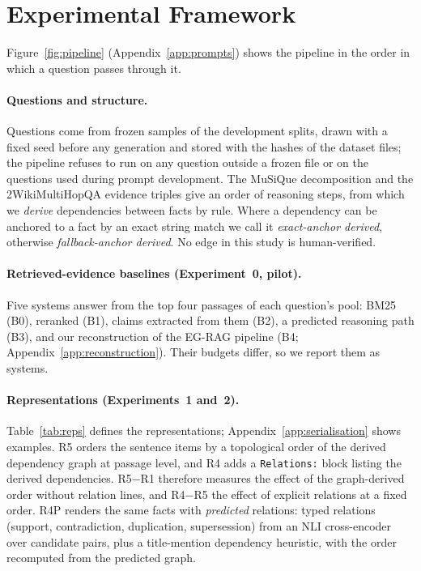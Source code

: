 \section{Experimental Framework}
\label{sec:framework}

Figure~\ref{fig:pipeline} (Appendix~\ref{app:prompts}) shows the pipeline in the order in which a question passes through it.


\paragraph{Questions and structure.}
Questions come from frozen samples of the development splits, drawn with a fixed seed before any generation and stored with the hashes of the dataset files; the pipeline refuses to run on any question outside a frozen file or on the questions used during prompt development. The MuSiQue decomposition and the 2WikiMultiHopQA evidence triples give an order of reasoning steps, from which we \emph{derive} dependencies between facts by rule. Where a dependency can be anchored to a fact by an exact string match we call it \emph{exact-anchor derived}, otherwise \emph{fallback-anchor derived}. No edge in this study is human-verified.

\paragraph{Retrieved-evidence baselines (Experiment~0, pilot).}
Five systems answer from the top four passages of each question's pool: BM25 (B0), reranked (B1), claims extracted from them (B2), a predicted reasoning path (B3), and our reconstruction of the EG-RAG pipeline (B4; Appendix~\ref{app:reconstruction}). Their budgets differ, so we report them as systems.

\paragraph{Representations (Experiments~1 and~2).}
Table~\ref{tab:reps} defines the representations; Appendix~\ref{app:serialisation} shows examples. R5 orders the sentence items by a topological order of the derived dependency graph at passage level, and R4 adds a \texttt{Relations:} block listing the derived dependencies. R5$-$R1 therefore measures the effect of the graph-derived order without relation lines, and R4$-$R5 the effect of explicit relations at a fixed order. R4P renders the same facts with \emph{predicted} relations: typed relations (support, contradiction, duplication, supersession) from an NLI cross-encoder over candidate pairs, plus a title-mention dependency heuristic, with the order recomputed from the predicted graph.

